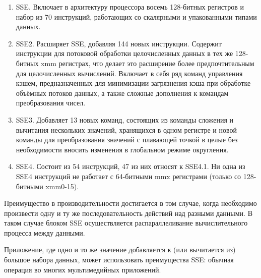 \begin{enumerate}
	\item SSE. Включает в архитектуру процессора восемь 128-битных регистров и набор из 70 инструкций, работающих со скалярными и упакованными типами данных.
	\item SSE2. Расширяет SSE, добавляя 144 новых инструкции. Содержит инструкции для потоковой обработки целочисленных данных в тех же 128-битных xmm регистрах, что делает это расширение более предпочтительным для целочисленных вычислений. Включает в себя ряд команд управления кэшем, предназначенных для минимизации загрязнения кэша при обработке объёмных потоков данных, а также сложные дополнения к командам преобразования чисел.
	\item SSE3. Добавляет 13 новых команд, состоящих из команды сложения и вычитания нескольких значений, хранящихся в одном регистре и новой команды для преобразования значений с плавающей точкой в целые без необходимости вносить изменения в глобальном режиме округления.
	\item SSE4. Состоит из 54 инструкций, 47 из них относят к SSE4.1. Ни одна из SSE4 инструкций не работает с 64-битными mmx регистрами (только со 128-битными xmm0-15).
\end{enumerate}

\begin{figure}[ht!]
\end{figure}

Преимущество в производительности достигается в том случае, когда необходимо произвести одну и ту же последовательность действий над разными данными. В таком случае блоком SSE осуществляется распараллеливание вычислительного процесса между данными.

Приложение, где одно и то же значение добавляется к (или вычитается из) большое набора данных, может использовать преимущества SSE: обычная операция во многих мультимедийных приложений.

